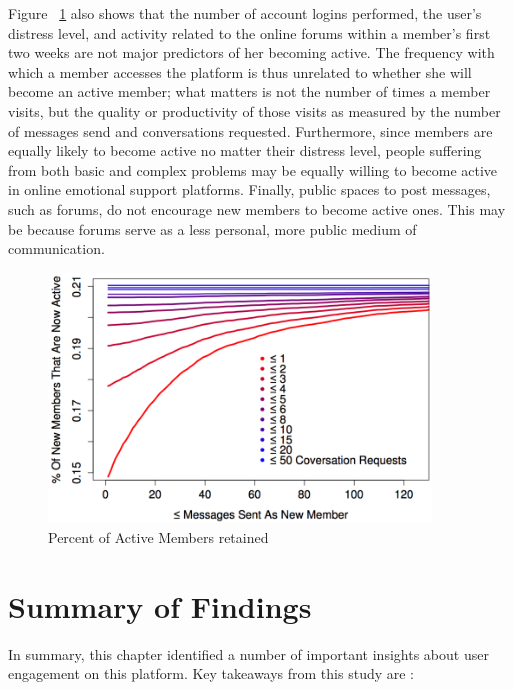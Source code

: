 \newpage
Figure ~\ref{fig:5.6} also shows that the number of account logins performed, the user’s distress level, and activity related to the online forums within a member’s first two weeks are not major predictors of her becoming active. The frequency with which a member accesses the platform is thus unrelated to whether she will become an active member; what matters is not the number of times a member visits, but the quality or productivity of those visits as measured by the number of messages send and conversations requested. Furthermore, since members are equally likely to become active no matter their distress level, people suffering from both basic and complex problems may be equally willing to become active in online emotional support platforms. Finally, public spaces to post messages, such as forums, do not encourage new members to become active ones. This may be because forums serve as a less personal, more public medium of communication.

\begin{figure}
	\centering %
	\includegraphics[width=4in]{Per.png} %
	\caption{Percent of Active Members retained} 
	\label{fig:5.6}
\end{figure}

\section{Summary of Findings}
In summary, this chapter identified a number of important insights about user engagement on this platform. Key takeaways from this study are :

